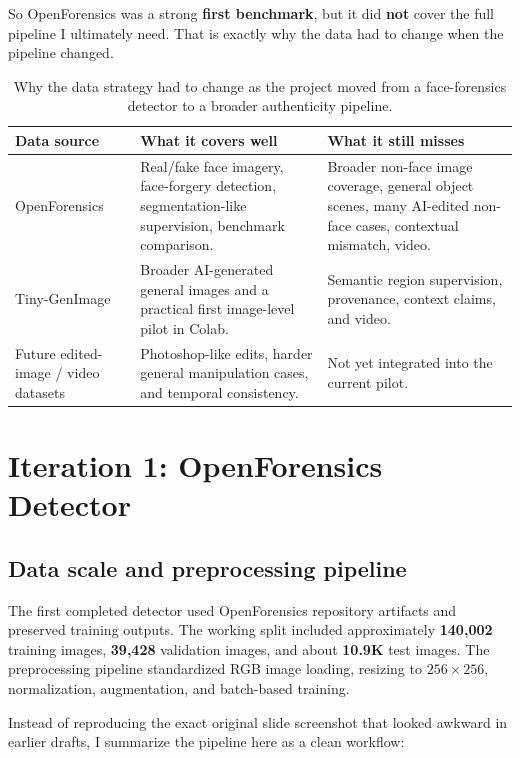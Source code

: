 \documentclass[11pt]{article}
\begin{document}
So OpenForensics was a strong \textbf{first benchmark}, but it did \textbf{not} cover the full pipeline I ultimately need. That is exactly why the data had to change when the pipeline changed.

\begin{table}[H]
\centering
\small
\begin{tabularx}{0.98\textwidth}{>{\raggedright\arraybackslash}p{2.5cm} >{\raggedright\arraybackslash}p{4.6cm} >{\raggedright\arraybackslash}X}
\toprule
\textbf{Data source} & \textbf{What it covers well} & \textbf{What it still misses} \\
\midrule
OpenForensics & Real/fake face imagery, face-forgery detection, segmentation-like supervision, benchmark comparison. & Broader non-face image coverage, general object scenes, many AI-edited non-face cases, contextual mismatch, video. \\
Tiny-GenImage & Broader AI-generated general images and a practical first image-level pilot in Colab. & Semantic region supervision, provenance, context claims, and video. \\
Future edited-image / video datasets & Photoshop-like edits, harder general manipulation cases, and temporal consistency. & Not yet integrated into the current pilot. \\
\bottomrule
\end{tabularx}
\caption{Why the data strategy had to change as the project moved from a face-forensics detector to a broader authenticity pipeline.}
\end{table}

\section{Iteration 1: OpenForensics Detector}

\subsection{Data scale and preprocessing pipeline}

The first completed detector used OpenForensics repository artifacts and preserved training outputs. The working split included approximately \textbf{140,002} training images, \textbf{39,428} validation images, and about \textbf{10.9K} test images. The preprocessing pipeline standardized RGB image loading, resizing to \(256\times256\), normalization, augmentation, and batch-based training.

Instead of reproducing the exact original slide screenshot that looked awkward in earlier drafts, I summarize the pipeline here as a clean workflow:
\end{document}
